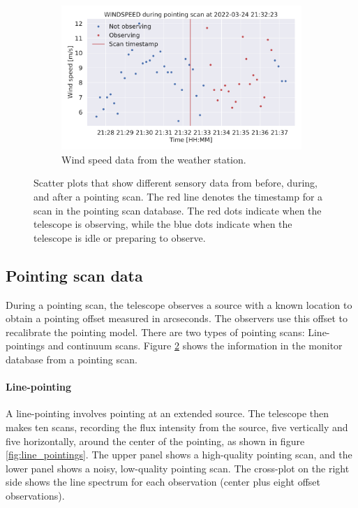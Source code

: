 \begin{figure}[H]
\begin{subfigure}[t]{0.49\textwidth}
        \centering
        \includegraphics[width=\textwidth]{Feature during scans/scan_WINDSPEED_335.pdf}
        \caption{Wind speed data from the weather station.}
        \label{subfig:scan_windspeed}
    \end{subfigure}
     \caption{Scatter plots that show different sensory data from before, during, and after a pointing scan. The red line denotes the timestamp for a scan in the pointing scan database.
     The red dots indicate when the telescope is observing, while the blue dots indicate when the telescope is idle or preparing to observe.}
     \label{fig:features_during_scans}
\end{figure}


\subsection{Pointing scan data}
During a pointing scan, the telescope observes a source with a known location to obtain a pointing offset measured in arcseconds.
The observers use this offset to recalibrate the pointing model. There are two types of pointing scans: Line-pointings and continuum scans.
Figure \ref{fig:features_during_scans} shows the information in the monitor database from a pointing scan.

\paragraph{Line-pointing}
A line-pointing involves pointing at an extended source. 
The telescope then makes ten scans, recording the flux intensity from the source, five vertically and five horizontally,
around the center of the pointing, as shown in figure \ref{fig:line_pointings}.
The upper panel shows a high-quality pointing scan, and the lower panel shows a noisy, low-quality pointing scan.
The cross-plot on the right side shows the line spectrum for each observation (center plus eight offset observations).


